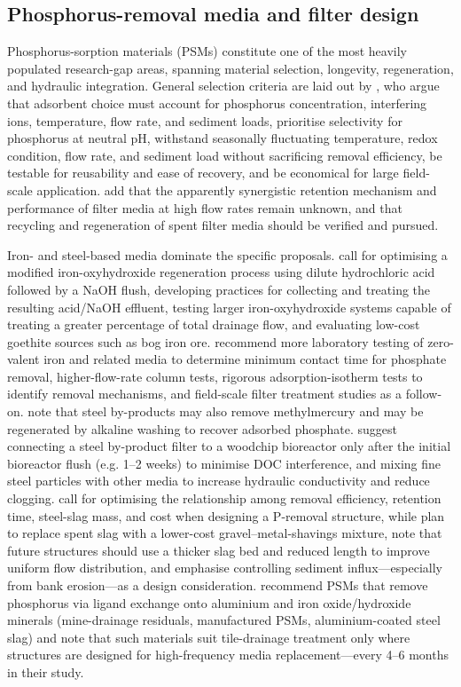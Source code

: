 \subsection{Phosphorus-removal media and filter design}
Phosphorus-sorption materials (PSMs) constitute one of the most heavily populated research-gap areas, spanning material selection, longevity, regeneration, and hydraulic integration. General selection criteria are laid out by \textcite{Li2020}, who argue that adsorbent choice must account for phosphorus concentration, interfering ions, temperature, flow rate, and sediment loads, prioritise selectivity for phosphorus at neutral pH, withstand seasonally fluctuating temperature, redox condition, flow rate, and sediment load without sacrificing removal efficiency, be testable for reusability and ease of recovery, and be economical for large field-scale application. \textcite{Mendes2022} add that the apparently synergistic retention mechanism and performance of filter media at high flow rates remain unknown, and that recycling and regeneration of spent filter media should be verified and pursued.

Iron- and steel-based media dominate the specific proposals. \textcite{Allred2017} call for optimising a modified iron-oxyhydroxide regeneration process using dilute hydrochloric acid followed by a NaOH flush, developing practices for collecting and treating the resulting acid/NaOH effluent, testing larger iron-oxyhydroxide systems capable of treating a greater percentage of total drainage flow, and evaluating low-cost goethite sources such as bog iron ore. \textcite{Allred2014} recommend more laboratory testing of zero-valent iron and related media to determine minimum contact time for phosphate removal, higher-flow-rate column tests, rigorous adsorption-isotherm tests to identify removal mechanisms, and field-scale filter treatment studies as a follow-on. \textcite{Hua2016} note that steel by-products may also remove methylmercury and may be regenerated by alkaline washing to recover adsorbed phosphate. \textcite{Sellner2019b} suggest connecting a steel by-product filter to a woodchip bioreactor only after the initial bioreactor flush (e.g. 1--2 weeks) to minimise DOC interference, and mixing fine steel particles with other media to increase hydraulic conductivity and reduce clogging. \textcite{Wang2020d} call for optimising the relationship among removal efficiency, retention time, steel-slag mass, and cost when designing a P-removal structure, while \textcite{Shedekar2020} plan to replace spent slag with a lower-cost gravel--metal-shavings mixture, note that future structures should use a thicker slag bed and reduced length to improve uniform flow distribution, and emphasise controlling sediment influx---especially from bank erosion---as a design consideration. \textcite{Penn2020} recommend PSMs that remove phosphorus via ligand exchange onto aluminium and iron oxide/hydroxide minerals (mine-drainage residuals, manufactured PSMs, aluminium-coated steel slag) and note that such materials suit tile-drainage treatment only where structures are designed for high-frequency media replacement---every 4--6 months in their study.

